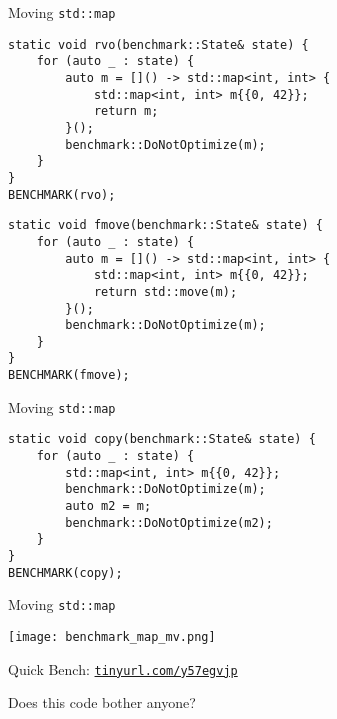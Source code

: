\begin{frame}[fragile]{Moving \texttt{std::map}}
    \begin{lstlisting}
static void rvo(benchmark::State& state) {
    for (auto _ : state) {
        auto m = []() -> std::map<int, int> {
            std::map<int, int> m{{0, 42}};
            return m;
        }();
        benchmark::DoNotOptimize(m);
    }
}
BENCHMARK(rvo);
    \end{lstlisting}

    \begin{lstlisting}
static void fmove(benchmark::State& state) {
    for (auto _ : state) {
        auto m = []() -> std::map<int, int> {
            std::map<int, int> m{{0, 42}};
            return std::move(m);
        }();
        benchmark::DoNotOptimize(m);
    }
}
BENCHMARK(fmove);
    \end{lstlisting}
\end{frame}
\begin{frame}[fragile]{Moving \texttt{std::map}}
    \begin{lstlisting}
static void copy(benchmark::State& state) {
    for (auto _ : state) {
        std::map<int, int> m{{0, 42}};
        benchmark::DoNotOptimize(m);
        auto m2 = m;
        benchmark::DoNotOptimize(m2);
    }
}
BENCHMARK(copy);
    \end{lstlisting}
\end{frame}

\begin{frame}{Moving \texttt{std::map}}
    \centering
    \scalebox{1.5}{Quick Bench result}

    \texttt{[image: benchmark\_map\_mv.png]}

    Quick Bench: \href{http://quick-bench.com/7L-__vxvraDDacztJoalrjBrMUA}{\texttt{tinyurl.com/y57egvjp}}
\end{frame}

\begin{frame}
    \centering
    \scalebox{5}{Why?}
\end{frame}

\begin{frame}[fragile]{Does this code bother anyone?}
\end{frame}

\begin{frame}
    \centering
    \scalebox{2}{Interlude}

\end{frame}

